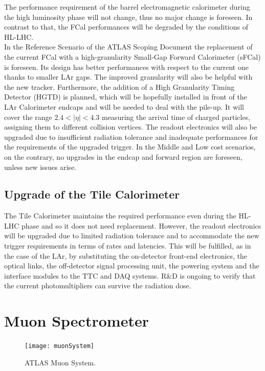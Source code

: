 \documentclass[a4paper,twoside,12pt]{book}
\begin{document}
The performance requirement of the barrel electromagnetic calorimeter during the high luminosity phase will not change, thus no major change is foreseen. In contrast to that, the FCal performances will be degraded by the conditions of HL-LHC. \\

In the Reference Scenario of the ATLAS Scoping Document\cite{scoping} the replacement of the current FCal with a high-granularity Small-Gap Forward Calorimeter (sFCal) is foreseen. Its design has better performances with respect to the current one thanks to smaller LAr gaps. The improved granularity will also be helpful with the new 
tracker. Furthermore, the addition of a High Granularity Timing Detector (HGTD) is planned, which will be hopefully installed in front of the LAr Calorimeter endcaps and will be needed to deal with the
pile-up. It will cover the range $2.4 < |\eta| < 4.3$ measuring the arrival time of charged particles, assigning them to different collision vertices. The readout electronics will also be upgraded due to insufficient radiation tolerance and inadequate performances for the requirements of the upgraded trigger. In the Middle and Low cost 
scenarios, on the contrary, no upgrades in the endcap and forward region are foreseen, unless new issues arise. \\

\subsection*{Upgrade of the Tile Calorimeter}

The Tile Calorimeter maintains the required performance even during the HL-LHC phase and
so it does not need replacement. However, the readout electronics will be upgraded due to limited radiation tolerance and to accommodate the new trigger requirements in terms of rates and latencies. This will be fulfilled, as in the case of the LAr, by substituting the on-detector front-end electronics, the optical links, the off-detector signal processing unit, the powering system and the interface modules to the TTC and DAQ systems. R\&D is ongoing to verify that the current photomultipliers can survive the radiation dose.

\section{Muon Spectrometer}\label{sec:muon}

\begin{figure} [h]
	\centering
	\texttt{[image: muonSystem]}
	\caption{ATLAS Muon System\cite{muon_tdr}.}
	\label{fig:muonSystem}
\end{figure}
\end{document}
